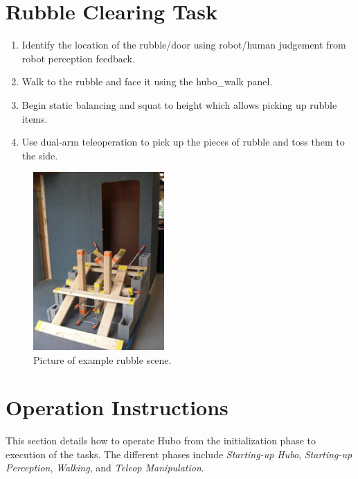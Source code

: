 \documentclass[letterpaper, 10 pt]{report}
\begin{document}
\newpage

%
\section*{Rubble Clearing Task}\label{sec:rubble-clearing-task}
\begin{enumerate}
\item Identify the location of the rubble/door using robot/human judgement from robot perception feedback.
\item Walk to the rubble and face it using the hubo\_walk panel.
\item Begin static balancing and squat to height which allows picking up rubble items.
\item Use dual-arm teleoperation to pick up the pieces of rubble and toss them to the side.
\end{enumerate}
\begin{figure}[ht]
  \centering
  \includegraphics[width=5.0cm]{resources/rubble-clearing}
  \caption{Picture of example rubble scene.}
  \label{fig:Rubble-image}
\end{figure}

\newpage

%
\section*{Operation Instructions}\label{sec:operating-instructions}
This section details how to operate Hubo from the initialization phase to execution of the tasks. The different phases include \textit{Starting-up Hubo}, \textit{Starting-up Perception}, \textit{Walking}, and \textit{Teleop Manipulation}.
\end{document}
